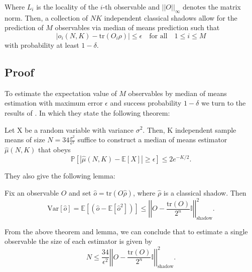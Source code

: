 \documentclass[12pt]{article}
\begin{document}
    Where $L_i$ is the locality of the $i$-th observable and $||O||_\infty$ denotes the matrix norm. Then, a collection of $NK$ independent classical shadows allow for the prediction of $M$ observables via median of means prediction such that
    \begin{equation*}
        |\hat{o}_i(N,K) - \text{tr}(O_i\rho)| \leq \epsilon \quad \text{for all} \quad 1 \leq i \leq M
    \end{equation*}
    with probability at least $1-\delta$.

    \subsection{Proof}
    To estimate the expectation value of $M$ observables by median of means estimation with maximum error $\epsilon$ and success probability $1-\delta$ we turn to the results of \cite{Huang_Kueng_Preskill_2020}. In which they state the following theorem:
    \begin{theorem}
        Let X be a random variable with variance $\sigma^2$. Then, K independent sample means of size $N = 34 \frac{\sigma^2}{\epsilon^2}$ suffice to construct a median of means estimator $\hat{\mu}(N, K)$ that obeys 
        \begin{equation}
            \mathbb{P}[|\hat{\mu}(N, K) - \mathbb{E}[X]| \geq \epsilon] \leq 2e^{-K/2}.
        \end{equation}
    \end{theorem}

    They also give the following lemma:
    \begin{lemma}
        Fix an observable $O$ and set $\hat{o} = \text{tr}(O\hat{\rho})$, where $\hat{\rho}$ is a classical shadow. Then
        \begin{equation}
            \text{Var}[\hat{o}] = \mathbb{E}\left[(\hat{o}-\mathbb{E}[\hat{o}^2])\right] \leq \left|\left| O - \frac{\text{tr}(O)}{2^n} \mathbb{I} \right|\right|^2_\text{shadow}.
        \end{equation}
    \end{lemma}

    From the above theorem and lemma, we can conclude that to estimate a single observable the size of each estimator is given by 
    \begin{equation}
        N \leq \frac{34}{\epsilon^2}\left|\left| O - \frac{\text{tr}(O)}{2^n} \mathbb{I} \right|\right|^2_\text{shadow}.
    \end{equation}
\end{document}
